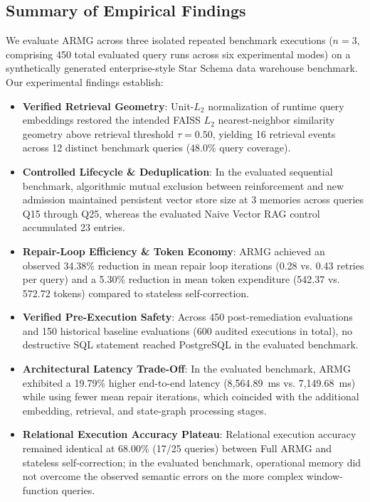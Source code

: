 \subsection{Summary of Empirical Findings}
We evaluate ARMG across three isolated repeated benchmark executions ($n = 3$, comprising 450 total evaluated query runs across six experimental modes) on a synthetically generated enterprise-style Star Schema data warehouse benchmark. Our experimental findings establish:
\begin{itemize}
    \item \textbf{Verified Retrieval Geometry}: Unit-$L_2$ normalization of runtime query embeddings restored the intended FAISS $L_2$ nearest-neighbor similarity geometry above retrieval threshold $\tau = 0.50$, yielding 16 retrieval events across 12 distinct benchmark queries ($48.0\%$ query coverage).
    \item \textbf{Controlled Lifecycle \& Deduplication}: In the evaluated sequential benchmark, algorithmic mutual exclusion between reinforcement and new admission maintained persistent vector store size at 3 memories across queries Q15 through Q25, whereas the evaluated Naive Vector RAG control accumulated 23 entries.
    \item \textbf{Repair-Loop Efficiency \& Token Economy}: ARMG achieved an observed 34.38\% reduction in mean repair loop iterations (0.28 vs. 0.43 retries per query) and a 5.30\% reduction in mean token expenditure (542.37 vs. 572.72 tokens) compared to stateless self-correction.
    \item \textbf{Verified Pre-Execution Safety}: Across 450 post-remediation evaluations and 150 historical baseline evaluations (600 audited executions in total), no destructive SQL statement reached PostgreSQL in the evaluated benchmark.
    \item \textbf{Architectural Latency Trade-Off}: In the evaluated benchmark, ARMG exhibited a 19.79\% higher end-to-end latency (8,564.89~ms vs. 7,149.68~ms) while using fewer mean repair iterations, which coincided with the additional embedding, retrieval, and state-graph processing stages.
    \item \textbf{Relational Execution Accuracy Plateau}: Relational execution accuracy remained identical at 68.00\% (17/25 queries) between Full ARMG and stateless self-correction; in the evaluated benchmark, operational memory did not overcome the observed semantic errors on the more complex window-function queries.
\end{itemize}

